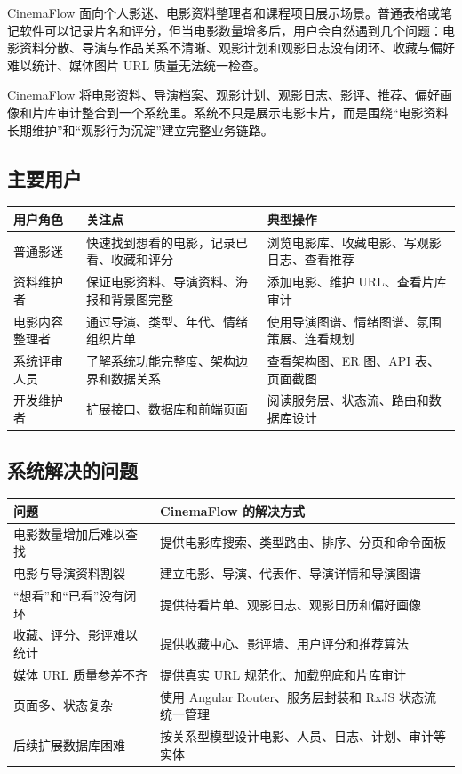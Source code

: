 \documentclass[
]{ctexart}
\begin{document}
CinemaFlow
面向个人影迷、电影资料整理者和课程项目展示场景。普通表格或笔记软件可以记录片名和评分，但当电影数量增多后，用户会自然遇到几个问题：电影资料分散、导演与作品关系不清晰、观影计划和观影日志没有闭环、收藏与偏好难以统计、媒体图片
URL 质量无法统一检查。

CinemaFlow
将电影资料、导演档案、观影计划、观影日志、影评、推荐、偏好画像和片库审计整合到一个系统里。系统不只是展示电影卡片，而是围绕``电影资料长期维护''和``观影行为沉淀''建立完整业务链路。

\hypertarget{ux4e3bux8981ux7528ux6237}{%
\subsection{主要用户}\label{ux4e3bux8981ux7528ux6237}}

\begin{longtable}[]{@{}lll@{}}
\toprule
用户角色 & 关注点 & 典型操作 \\
\midrule
\endhead
普通影迷 & 快速找到想看的电影，记录已看、收藏和评分 &
浏览电影库、收藏电影、写观影日志、查看推荐 \\
资料维护者 & 保证电影资料、导演资料、海报和背景图完整 & 添加电影、维护
URL、查看片库审计 \\
电影内容整理者 & 通过导演、类型、年代、情绪组织片单 &
使用导演图谱、情绪图谱、氛围策展、连看规划 \\
系统评审人员 & 了解系统功能完整度、架构边界和数据关系 & 查看架构图、ER
图、API 表、页面截图 \\
开发维护者 & 扩展接口、数据库和前端页面 &
阅读服务层、状态流、路由和数据库设计 \\
\bottomrule
\end{longtable}

\hypertarget{ux7cfbux7edfux89e3ux51b3ux7684ux95eeux9898}{%
\subsection{系统解决的问题}\label{ux7cfbux7edfux89e3ux51b3ux7684ux95eeux9898}}

\begin{longtable}[]{@{}ll@{}}
\toprule
问题 & CinemaFlow 的解决方式 \\
\midrule
\endhead
电影数量增加后难以查找 &
提供电影库搜索、类型路由、排序、分页和命令面板 \\
电影与导演资料割裂 & 建立电影、导演、代表作、导演详情和导演图谱 \\
``想看''和``已看''没有闭环 &
提供待看片单、观影日志、观影日历和偏好画像 \\
收藏、评分、影评难以统计 & 提供收藏中心、影评墙、用户评分和推荐算法 \\
媒体 URL 质量参差不齐 & 提供真实 URL 规范化、加载兜底和片库审计 \\
页面多、状态复杂 & 使用 Angular Router、服务层封装和 RxJS
状态流统一管理 \\
后续扩展数据库困难 &
按关系型模型设计电影、人员、日志、计划、审计等实体 \\
\bottomrule
\end{longtable}
\end{document}
